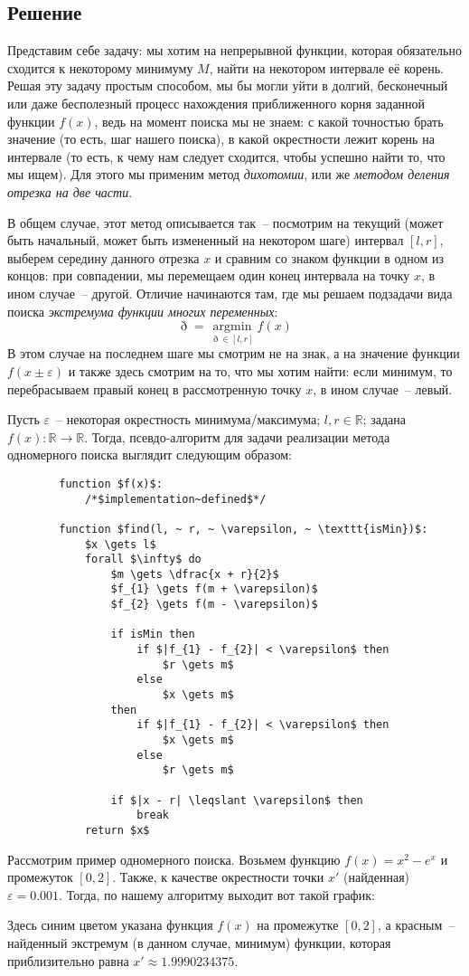 \documentclass[12pt, a4paper, oneside]{article}
\begin{document}
	\subsection*{Решение}
	Представим себе задачу: мы хотим на непрерывной функции, которая обязательно сходится к некоторому минимуму $M$, найти на некотором интервале её корень. Решая эту задачу простым способом, мы бы могли уйти в долгий, бесконечный или даже бесполезный процесс нахождения приближенного корня заданной функции $f(x)$, ведь на момент поиска мы не знаем: с какой точностью брать значение (то есть, шаг нашего поиска), в какой окрестности лежит корень на интервале (то есть, к чему нам следует сходится, чтобы успешно найти то, что мы ищем). Для этого мы применим метод \textit{дихотомии}, или же \textit{методом деления отрезка на две части}.

	В общем случае, этот метод описывается так~-- посмотрим на текущий (может быть начальный, может быть измененный на некотором шаге) интервал $[l, r]$, выберем середину данного отрезка $x$ и сравним со знаком функции в одном из концов: при совпадении, мы перемещаем один конец интервала на точку $x$, в ином случае~-- другой. Отличие начинаются там, где мы решаем подзадачи вида поиска \textit{экстремума функции многих переменных}:
	\[
		\eth = \operatorname*{argmin}_{\eth \in [l, r]}{f(x)}
	\]
	В этом случае на последнем шаге мы смотрим не на знак, а на значение функции $f(x \pm \varepsilon)$ и также здесь смотрим на то, что мы хотим найти: если минимум, то перебрасываем правый конец в рассмотренную точку $x$, в ином случае~-- левый.

	Пусть $\varepsilon$~-- некоторая окрестность минимума/максимума; $l, r \in \mathbb{R}$; задана $f(x) : \mathbb{R} \to \mathbb{R}$. Тогда, псевдо-алгоритм для задачи реализации метода одномерного поиска выглядит следующим образом:
	\begin{lstlisting}
		function $f(x)$:
			/*$implementation~defined$*/
		
		function $find(l, ~ r, ~ \varepsilon, ~ \texttt{isMin})$:
			$x \gets l$
			forall $\infty$ do
				$m \gets \dfrac{x + r}{2}$
				$f_{1} \gets f(m + \varepsilon)$
				$f_{2} \gets f(m - \varepsilon)$

				if isMin then
					if $|f_{1} - f_{2}| < \varepsilon$ then
						$r \gets m$
					else
						$x \gets m$
				then
					if $|f_{1} - f_{2}| < \varepsilon$ then
						$x \gets m$
					else
						$r \gets m$

				if $|x - r| \leqslant \varepsilon$ then
					break
			return $x$
	\end{lstlisting}
	Рассмотрим пример одномерного поиска. Возьмем функцию $f(x) = x^{2} - e^{x}$ и промежуток $[0, 2]$. Также, к качестве окрестности точки $x'$ (найденная) $\varepsilon = 0.001$. Тогда, по нашему алгоритму выходит вот такой график:
	\begin{flushleft}
		
	\end{flushleft}
	Здесь синим цветом указана функция $f(x)$ на промежутке $[0, 2]$, а красным~-- найденный экстремум (в данном случае, минимум) функции, которая приблизительно равна $x' \approx 1.9990234375$.
\end{document}
